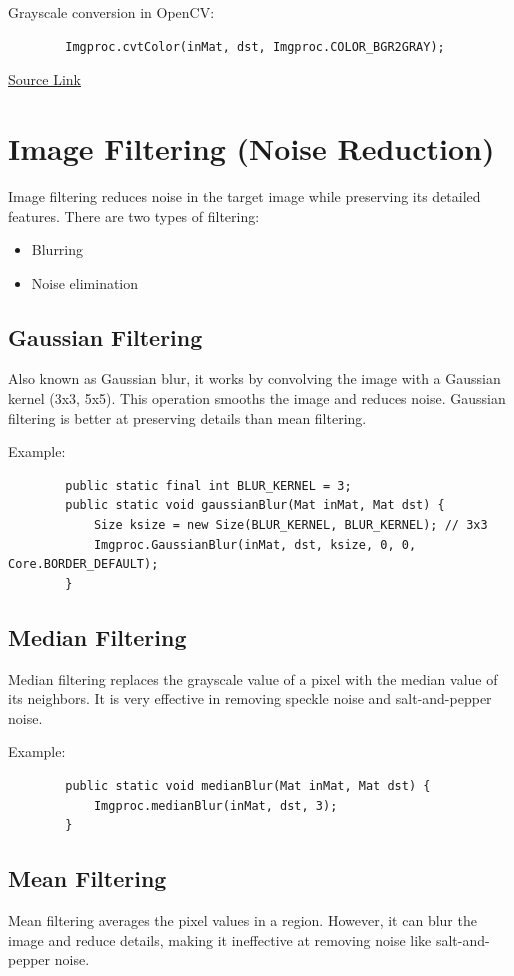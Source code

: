 \documentclass{article}
\begin{document}
	Grayscale conversion in OpenCV:
	\begin{verbatim}
		Imgproc.cvtColor(inMat, dst, Imgproc.COLOR_BGR2GRAY);
	\end{verbatim}
	
	\href{https://leejason.blog.csdn.net/article/details/106416128}{Source Link}
	
	\section{Image Filtering (Noise Reduction)}
	Image filtering reduces noise in the target image while preserving its detailed features. There are two types of filtering:
	\begin{itemize}
		\item Blurring
		\item Noise elimination
	\end{itemize}
	
	\subsection{Gaussian Filtering}
	Also known as Gaussian blur, it works by convolving the image with a Gaussian kernel (3x3, 5x5). This operation smooths the image and reduces noise. Gaussian filtering is better at preserving details than mean filtering.
	
	Example:
	\begin{verbatim}
		public static final int BLUR_KERNEL = 3;
		public static void gaussianBlur(Mat inMat, Mat dst) {
			Size ksize = new Size(BLUR_KERNEL, BLUR_KERNEL); // 3x3
			Imgproc.GaussianBlur(inMat, dst, ksize, 0, 0, Core.BORDER_DEFAULT);
		}
	\end{verbatim}
	
	\subsection{Median Filtering}
	Median filtering replaces the grayscale value of a pixel with the median value of its neighbors. It is very effective in removing speckle noise and salt-and-pepper noise.
	
	Example:
	\begin{verbatim}
		public static void medianBlur(Mat inMat, Mat dst) {
			Imgproc.medianBlur(inMat, dst, 3);
		}
	\end{verbatim}
	
	\subsection{Mean Filtering}
	Mean filtering averages the pixel values in a region. However, it can blur the image and reduce details, making it ineffective at removing noise like salt-and-pepper noise.
	
\end{document}
